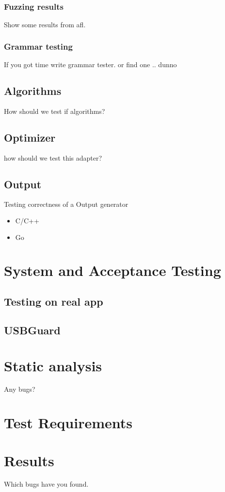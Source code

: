 \subsubsection{Fuzzing results}
Show some results from afl.
\subsubsection{Grammar testing}
If you got time write grammar tester. or find one .. dunno

\subsection{Algorithms}
How should we test if algorithms?
\subsection{Optimizer}
how should we test this adapter?
\subsection{Output}
Testing correctness of a Output generator
\begin{itemize}
	\item{C/C++}
	\item{Go}
\end{itemize}

\section{System and Acceptance Testing}
\subsection{Testing on real app}
\subsection{USBGuard}

\section{Static analysis}
Any bugs?

\section{Test Requirements}

\section{Results}
Which bugs have you found.



